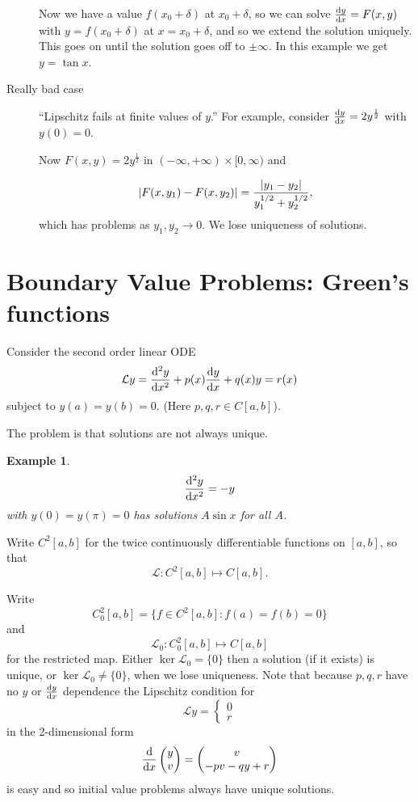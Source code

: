 \documentclass{notes}
\theoremstyle{plain}
\newtheorem{example}[proposition]{Example}
\newcommand{\cL}{\mathcal{L}}
\begin{document}
\begin{description}
Now we have a value $ f(x_{0} + \delta) $ at $ x_{0} + \delta $, 
so we can solve $\frac{\mathrm{d} y}{\mathrm{d} x} = F(x,y)$ with $y=f(x_{0}+ \delta)$ at
$ x = x_{0} + \delta $, and so we extend the solution uniquely. 
This goes on until the solution goes off to $ \pm \infty $.
In this example we get $ y = \tan x $.

\item[Really bad case] ``Lipschitz fails at finite values of $ y $.''
For example, consider
$\frac{\mathrm{d} y}{\mathrm{d} x} = 2 y^{\frac{1}{2}}$ with $ y(0)=0 $.

Now $F(x,y) = 2y^{\frac{1}{2}}$ in $ ( -\infty, +\infty ) \times [0, \infty) 
$ and 

\[ \left|F(x,y_{1}) - F(x,y_{2}) \right| = 
\frac{\left|y_{1}-y_{2}\right|}{y_{1}^{1/2}+y_{2}^{1/2}},
 \]
which has problems as $ y_{1},y_{2} \to 0 $.
We lose uniqueness of solutions.
\end{description}

\section{Boundary Value Problems: Green's functions}
Consider the second order linear ODE
\[ \cL y = \diff{^2 y}{x^2} + p(x) \diff{y}{x} + q(x) y = r(x) \] 
subject to $ y(a)=y(b) =0 $. (Here $ p,q,r \in C[a,b] $).

The problem is that solutions are not always unique.

\begin{example}
\[ \frac{\mathrm{d}^2 y}{\mathrm{d} x^2} = - y \] with $ y(0)=y(\pi) =0 $ has 
solutions $ A \sin x $ for all $ A $.
\end{example}

Write $ C^{2}[a,b] $ for the twice continuously differentiable 
functions on $ [a,b] $, so that \[ \cL\colon C^{2}[a,b] \mapsto C[a,b]. \]

Write \[ C_{0}^{2}[a,b] = \{ f \in C^{2}[a,b]:f(a)=f(b)=0 \} \] and \[ 
\cL_{0}\colon  C_{0}^{2}[a,b] \mapsto C[a,b] \] for the restricted map.
Either $\ker \cL_{0} = \{ 0 \} $ then a solution (if it exists) is 
unique, or $ \ker \cL_{0} \neq \{ 0 \} $, when we lose uniqueness.
Note that because $ p,q,r $ have no $ y $ or $ \frac{\mathrm{d} y}{\mathrm{d} x} $ dependence 
the Lipschitz condition for 
\[ \cL y = 
\begin{cases}
0 \\
r
\end{cases} \] in the 2-dimensional form
\[ \frac{\mathrm{d}}{\mathrm{d} x} \begin{pmatrix} y \\ v \end{pmatrix} = \begin{pmatrix} 
v \\ -pv-qy +r \end{pmatrix} \] is easy and so initial value problems
always have unique solutions.
\end{document}
